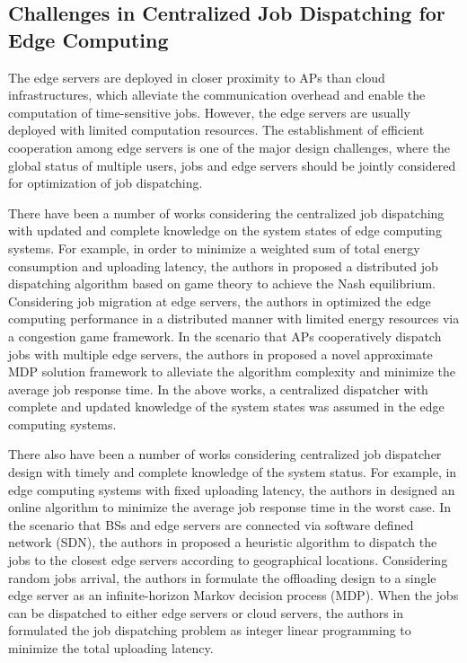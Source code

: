 \subsection{Challenges in Centralized Job Dispatching for Edge Computing}
The edge servers are deployed in closer proximity to APs than cloud infrastructures, which alleviate the communication overhead and enable the computation of time-sensitive jobs.
However, the edge servers are usually deployed with limited computation resources.
The establishment of efficient cooperation among edge servers is one of the major design challenges, where the global status of multiple users, jobs and edge servers should be jointly considered for optimization of job dispatching.

There have been a number of works considering the centralized job dispatching with updated and complete knowledge on the system states of edge computing systems.
For example, in order to minimize a weighted sum of total energy consumption and uploading latency, the authors in \cite{ToN-Xuchen2016} proposed a distributed job dispatching algorithm based on game theory to achieve the Nash equilibrium. 
Considering job migration at edge servers, the authors in \cite{ToN-xujie2018} optimized the edge computing performance in a distributed manner with limited energy resources via a congestion game framework.
In the scenario that APs cooperatively dispatch jobs with multiple edge servers, the authors in \cite{jcin2020-hong} proposed a novel approximate MDP solution framework to alleviate the algorithm complexity and minimize the average job response time.
In the above works, a centralized dispatcher with complete and updated knowledge of the system states was assumed in the edge computing systems.

There also have been a number of works considering centralized job dispatcher design with timely and complete knowledge of the system status.
For example, in edge computing systems with fixed uploading latency, the authors in \cite{tan-online} designed an online algorithm to minimize the average job response time in the worst case.
In the scenario that BSs and edge servers are connected via software defined network (SDN), the authors in \cite{IOTJ18-FanQ} proposed a heuristic algorithm to dispatch the jobs to the closest edge servers according to geographical locations.
Considering random jobs arrival, the authors in \cite{mdp-globecom,mdp-tvt} formulate the offloading design to a single edge server as an infinite-horizon Markov decision process (MDP).
When the jobs can be dispatched to either edge servers or cloud servers, the authors in \cite{MASS18-MengZ} formulated the job dispatching problem as integer linear programming to minimize the total uploading latency. %

